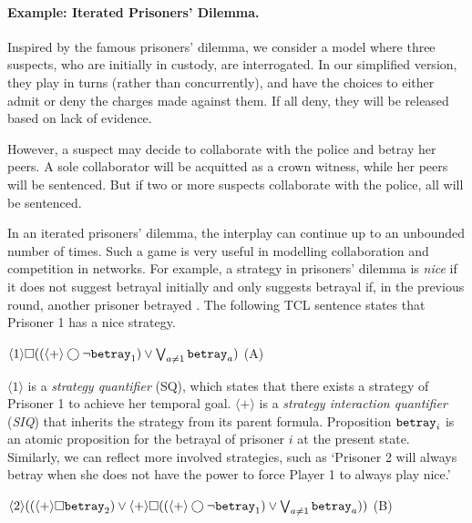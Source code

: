 \documentclass{llncs}
\newcommand{\pfrr}{\Box}
\newcommand{\nxt}{\bigcirc}
\begin{document}
\paragraph{\bf Example: Iterated Prisoners' Dilemma.} 
Inspired by the famous prisoners' dilemma, we consider a model where three suspects, who are initially in custody, are interrogated.
In our simplified version, they play in turns (rather than concurrently), and have the choices to either admit or deny the charges made against them.
If all deny, they will be released based on lack of evidence.

However, a suspect may decide to collaborate with the police and betray her peers.
A sole collaborator will be acquitted as a crown witness, while her peers will be sentenced.
But if two or more suspects collaborate with the police, all will be sentenced.

In an iterated prisoners' dilemma, the interplay can continue 
up to an unbounded number of times. 
Such a game is very useful in modelling collaboration and competition 
in networks.  
For example, a strategy in prisoners' dilemma is {\em nice} if 
it does not suggest betrayal initially and only suggests 
betrayal if, in the previous round, another prisoner betrayed 
\cite{Axelrod80}.  
The following TCL sentence states that Prisoner 1 has a nice strategy.
\begin{center} 
\hfill 
$\langle 1\rangle \pfrr ((\langle+\rangle \nxt \neg\mbox{\tt betray}_1)
\vee \bigvee_{a\neq 1}\mbox{\tt betray}_a)$
\hfill (A) 
\end{center} 
$\langle 1\rangle$ is a \emph{strategy quantifier} (SQ), which states
that there exists a strategy of Prisoner 1 to achieve her temporal goal. 
$\langle+\rangle$ is a {\em strategy interaction quantifier} 
({\em SIQ}) %
that inherits the strategy from its parent formula. 
Proposition $\mbox{\tt betray}_i$ is an atomic proposition for the betrayal 
of prisoner $i$ at the present state. 
Similarly, we can reflect more involved strategies, such as `Prisoner 2 will always betray when she does not have the power to force Player 1 to always play nice.'
\begin{center} 
\hfill 
$\langle 2\rangle (
(\langle+\rangle \pfrr \mbox{\tt betray}_2) 
\vee \langle+\rangle\pfrr ((\langle+\rangle \nxt \neg\mbox{\tt betray}_1)
\vee \bigvee_{a\neq 1}\mbox{\tt betray}_a))$
\hfill (B) 
\end{center} 
\end{document}
